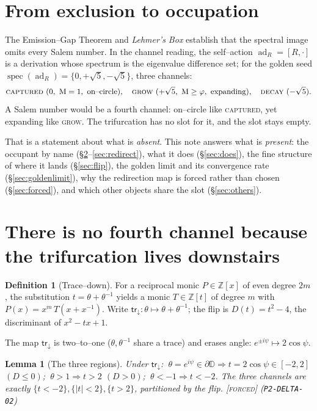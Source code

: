 \documentclass[11pt]{article}
\theoremstyle{plain}
\newtheorem{lemma}[theorem]{Lemma}
\theoremstyle{definition}
\newtheorem{definition}[theorem]{Definition}
\theoremstyle{remark}
\newcommand{\forced}{\textcolor{forcedc}{\textsc{[forced]}}}
\newcommand{\Z}{\mathbb{Z}}
\newcommand{\D}{\mathbb{D}}
\newcommand{\Mah}{\mathrm{M}}
\newcommand{\spec}{\operatorname{spec}}
\newcommand{\ad}{\operatorname{ad}}
\newcommand{\abs}[1]{\left\lvert #1 \right\rvert}
\newcommand{\trace}{\mathsf{tr}_{\!\downarrow}}
\begin{document}
\section{From exclusion to occupation}\label{sec:question}

The Emission--Gap Theorem and \emph{Lehmer's Box} establish that the spectral image omits every Salem number. In the channel reading, the self--action $\ad_R=[R,\cdot]$ is a derivation whose spectrum is the eigenvalue difference set; for the golden seed $\spec(\ad_R)=\{0,+\sqrt5,-\sqrt5\}$, three channels:
\[
\textsc{captured}\ (0,\ \Mah=1,\ \text{on--circle}),\quad
\textsc{grow}\ (+\sqrt5,\ \Mah\ge\varphi,\ \text{expanding}),\quad
\textsc{decay}\ (-\sqrt5).
\]
A Salem number would be a fourth channel: on--circle like \textsc{captured}, yet expanding like \textsc{grow}. The trifurcation has no slot for it, and the slot stays empty.

That is a statement about what is \emph{absent}. This note answers what is \emph{present}: the occupant by name (\S\ref{sec:downstairs}--\ref{sec:redirect}), what it does (\S\ref{sec:does}), the fine structure of where it lands (\S\ref{sec:flip}), the golden limit and its convergence rate (\S\ref{sec:goldenlimit}), why the redirection map is forced rather than chosen (\S\ref{sec:forced}), and which other objects share the slot (\S\ref{sec:others}).

\section{There is no fourth channel because the trifurcation lives downstairs}\label{sec:downstairs}

\begin{definition}[Trace--down]\label{def:trace}
For a reciprocal monic $P\in\Z[x]$ of even degree $2m$, the substitution $t=\theta+\theta^{-1}$ yields a monic $T\in\Z[t]$ of degree $m$ with $P(x)=x^m\,T(x+x^{-1})$. Write $\trace\colon\theta\mapsto\theta+\theta^{-1}$; the flip is $D(t)=t^2-4$, the discriminant of $x^2-tx+1$.
\end{definition}

The map $\trace$ is two--to--one ($\theta,\theta^{-1}$ share a trace) and erases angle: $e^{\pm i\psi}\mapsto2\cos\psi$.

\begin{lemma}[The three regions]\label{lem:regions}
Under $\trace$: $\ \theta=e^{i\psi}\in\partial\D\Rightarrow t=2\cos\psi\in[-2,2]$ $(D\le0)$; $\ \theta>1\Rightarrow t>2$ $(D>0)$; $\ \theta<-1\Rightarrow t<-2$. The three channels are exactly $\{t<-2\},\{\abs t<2\},\{t>2\}$, partitioned by the flip. \forced{} {\small(\texttt{P2-DELTA-02})}
\end{lemma}
\end{document}
